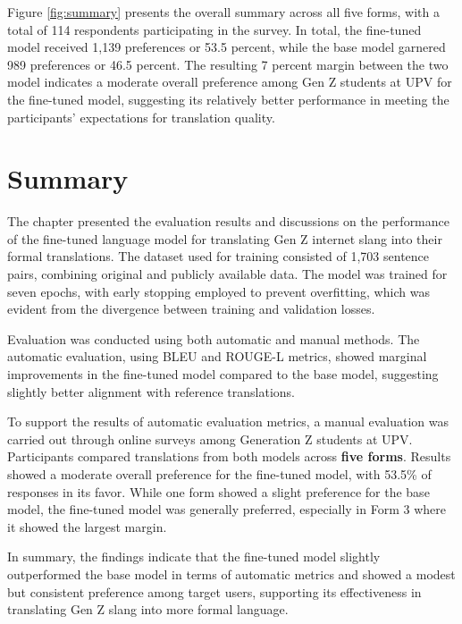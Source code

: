 Figure \ref{fig:summary} presents the overall summary across all five forms, with a total of 114 respondents participating in the survey. In total, the fine-tuned model received 1,139 preferences or 53.5 percent, while the base model garnered 989 preferences or 46.5 percent. The resulting 7 percent margin between the two model indicates a moderate overall preference among Gen Z students at UPV for the fine-tuned model, suggesting its relatively better performance in meeting the participants' expectations for translation quality. 

\section{Summary}
The chapter presented the evaluation results and discussions on the performance of the fine-tuned language model for translating Gen Z internet slang into their formal translations. The dataset used for training consisted of 1,703 sentence pairs, combining original and publicly available data. The model was trained for seven epochs, with early stopping employed to prevent overfitting, which was evident from the divergence between training and validation losses.

Evaluation was conducted using both automatic and manual methods. The automatic evaluation, using BLEU and ROUGE-L metrics, showed marginal improvements in the fine-tuned model compared to the base model, suggesting slightly better alignment with reference translations. 

To support the results of automatic evaluation metrics, a manual evaluation was carried out through online surveys among Generation Z students at UPV. Participants compared translations from both models across \textbf{five forms}. Results showed a moderate overall preference for the fine-tuned model, with 53.5\% of responses in its favor. While one form showed a slight preference for the base model, the fine-tuned model was generally preferred, especially in Form 3 where it showed the largest margin.

In summary, the findings indicate that the fine-tuned model slightly outperformed the base model in terms of automatic metrics and showed a modest but consistent preference among target users, supporting its effectiveness in translating Gen Z slang into more formal language.